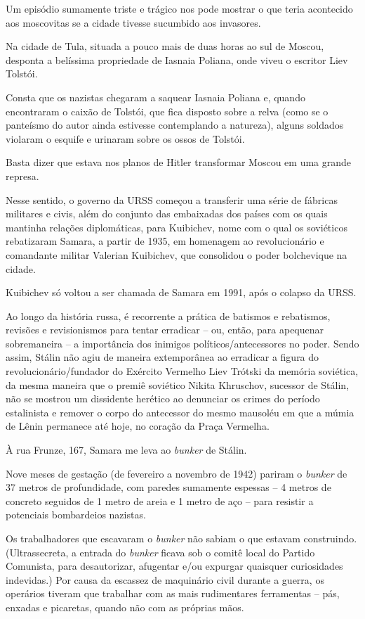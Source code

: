 Um episódio sumamente triste e trágico nos pode mostrar o que teria
acontecido aos moscovitas se a cidade tivesse sucumbido aos invasores.

Na cidade de Tula, situada a pouco mais de duas horas ao sul de Moscou,
desponta a belíssima propriedade de Iasnaia Poliana, onde viveu o
escritor Liev Tolstói.

Consta que os nazistas chegaram a saquear Iasnaia Poliana e, quando
encontraram o caixão de Tolstói, que fica disposto sobre a relva (como
se o panteísmo do autor ainda estivesse contemplando a natureza), alguns
soldados violaram o esquife e urinaram sobre os ossos de Tolstói.

Basta dizer que estava nos planos de Hitler transformar Moscou em uma
grande represa.

Nesse sentido, o governo da URSS começou a transferir uma série de
fábricas militares e civis, além do conjunto das embaixadas dos países
com os quais mantinha relações diplomáticas, para Kuibichev, nome com o
qual os soviéticos rebatizaram Samara, a partir de 1935, em homenagem ao
revolucionário e comandante militar Valerian Kuibichev, que consolidou o
poder bolchevique na cidade.

Kuibichev só voltou a ser chamada de Samara em 1991, após o colapso da
URSS.

Ao longo da história russa, é recorrente a prática de batismos e
rebatismos, revisões e revisionismos para tentar erradicar -- ou, então,
para apequenar sobremaneira -- a importância dos inimigos
políticos/antecessores no poder. Sendo assim, Stálin não agiu de maneira
extemporânea ao erradicar a figura do revolucionário/fundador do
Exército Vermelho Liev Trótski da memória soviética, da mesma maneira
que o premiê soviético Nikita Khruschov, sucessor de Stálin, não se
mostrou um dissidente herético ao denunciar os crimes do período
estalinista e remover o corpo do antecessor do mesmo mausoléu em que a
múmia de Lênin permanece até hoje, no coração da Praça Vermelha.

À rua Frunze, 167, Samara me leva ao \emph{bunker} de Stálin.

Nove meses de gestação (de fevereiro a novembro de 1942) pariram o
\emph{bunker} de 37 metros de profundidade, com paredes sumamente
espessas -- 4 metros de concreto seguidos de 1 metro de areia e 1 metro
de aço -- para resistir a potenciais bombardeios nazistas.

Os trabalhadores que escavaram o \emph{bunker} não sabiam o que estavam
construindo. (Ultrassecreta, a entrada do \emph{bunker} ficava sob o
comitê local do Partido Comunista, para desautorizar, afugentar e/ou
expurgar quaisquer curiosidades indevidas.) Por causa da escassez de
maquinário civil durante a guerra, os operários tiveram que trabalhar
com as mais rudimentares ferramentas -- pás, enxadas e picaretas, quando
não com as próprias mãos.

